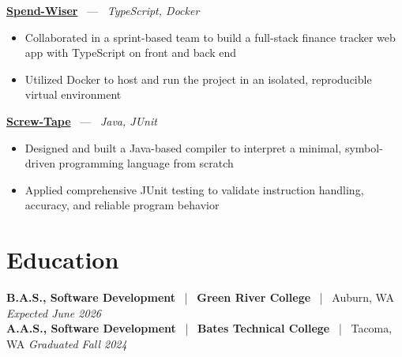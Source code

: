 \documentclass[10pt, letterpaper]{article}
\newcommand{\jobhead}[4]{%
  \vspace{5pt}%
  {\bfseries\color{dark}#1}%
  ~{\color{light}|}~%
  {\bfseries\color{navy}#2}%
  ~{\color{light}|}~%
  {\color{light}#3}%
  \hfill{\color{light}\small\textit{#4}}\\[-2pt]%
}
\newcommand{\projhead}[3]{%
  \vspace{5pt}%
  {\bfseries\color{dark}\href{#2}{#1}}%
  ~{\color{light}---}~%
  {\color{light}\small\textit{#3}}\\[-2pt]%
}
\begin{document}
\projhead{Spend-Wiser}{https://github.com/JesseChum/w26-sdev372-spendwiser-finance-tracker}{TypeScript, Docker}
\begin{itemize}
  \item Collaborated in a sprint-based team to build a full-stack finance tracker web app with TypeScript on front and back end
  \item Utilized Docker to host and run the project in an isolated, reproducible virtual environment
\end{itemize}

\projhead{Screw-Tape}{https://github.com/timmyd4/screwtape}{Java, JUnit}
\begin{itemize}
  \item Designed and built a Java-based compiler to interpret a minimal, symbol-driven programming language from scratch
  \item Applied comprehensive JUnit testing to validate instruction handling, accuracy, and reliable program behavior
\end{itemize}

\section{Education}

\jobhead{B.A.S., Software Development}{Green River College}{Auburn, WA}{Expected June 2026}
\jobhead{A.A.S., Software Development}{Bates Technical College}{Tacoma, WA}{Graduated Fall 2024}
\end{document}
